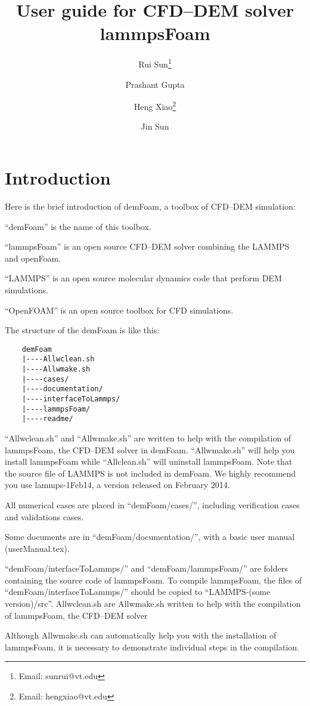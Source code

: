 \documentclass[11pt]{article}
\title{User guide for CFD--DEM solver lammpsFoam}
\author[1]{Rui Sun\thanks{Email: sunrui@vt.edu}}
\author[2]{Prashant Gupta}
\author[1]{Heng Xiao\thanks{Email: hengxiao@vt.edu}}
\author[2]{Jin Sun}
\affil[1]{Department of Aerospace and Ocean Engineering, Virginia Tech, United States}
\affil[2]{Institute for Infrastructure and Environment, The University of Edinburgh, UK}
\date{}
\begin{document}
\maketitle

\section{Introduction}

Here is the brief introduction of demFoam, a toolbox of CFD--DEM simulation:

``demFoam'' is the name of this toolbox. 

``lammpsFoam'' is an open source CFD--DEM solver combining the LAMMPS and openFoam.

``LAMMPS'' is an open source molecular dynamics code that perform DEM simulations.

``OpenFOAM'' is an open source toolbox for CFD simulations.

The structure of the demFoam is like this:

\begin{lstlisting}
    demFoam
    |----Allwclean.sh
    |----Allwmake.sh
    |----cases/
    |----documentation/
    |----interfaceToLammps/
    |----lammpsFoam/
    |----readme/
\end{lstlisting}

``Allwclean.sh'' and ``Allwmake.sh'' are written to help with the compilation of lammpsFoam, the
CFD--DEM solver in demFoam. ``Allwmake.sh'' will help you install lammpsFoam while ``Allclean.sh''
will uninstall lammpsFoam. Note that the source file of LAMMPS is not included in demFoam. We highly
recommend you use lammps-1Feb14, a version released on February 2014.

All numerical cases are placed in ``demFoam/cases/'', including verification cases and validations cases.

Some documents are in ``demFoam/documentation/'', with a basic user manual (userManual.tex).

``demFoam/interfaceToLammps/'' and ``demFoam/lammpsFoam/'' are folders containing the source code of
lammpsFoam. To compile lammpsFoam, the files of ``demFoam/interfaceToLammps/'' should be copied to
``LAMMPS-(some version)/src''.
Allwclean.sh are Allwmake.sh written to help with the compilation of lammpsFoam, the CFD--DEM solver


Although Allwmake.sh can automatically help you with the installation of lammpsFoam, it is necessary
to demonstrate individual steps in the compilation.
\end{document}
